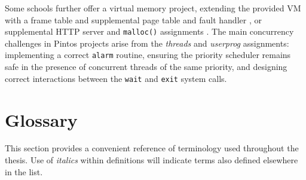 Some schools further offer a virtual memory project, extending the provided VM with a frame table and supplemental page table and fault handler \cite{standford-cs140,uchicago-cs230}, or supplemental HTTP server and {\tt malloc()} assignments \cite{berkeley-cs162}.
The main concurrency challenges in Pintos projects arise from the {\em threads} and {\em userprog} assignments:
implementing a correct {\tt alarm} routine,
ensuring the priority scheduler remains safe in the presence of concurrent threads of the same priority,
and designing correct interactions between the {\tt wait} and {\tt exit} system calls.

\section{Glossary}
\label{sec:glossary}

This section provides a convenient reference of terminology used throughout the thesis.
Use of {\em italics} within definitions will indicate terms also defined elsewhere in the list.

